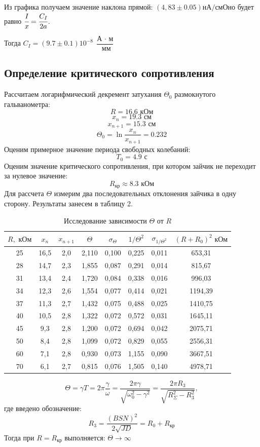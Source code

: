 \documentclass[a4paper, 12pt]{article}
\begin{document}
Из графика получаем значение наклона прямой: $(4,83\pm 0.05)\text{нА/см}$Оно будет равно $\cfrac{I}{x}=\cfrac{C_I}{2a}$. 

Тогда $\boxed{C_I = (9.7 \pm  0.1)10^{-8}\; \dfrac{\text{А $\cdot$ м}}{\text{ мм}}}$
	
\subsection*{Определение критического сопротивления}
Рассчитаем логарифмический декремент затухания $\Theta_0$ размокнутого гальванометра:
$$R = 16.6 \text{ кОм}$$
$$x_n = 19.3 \text{ см}$$
$$x_{n+1} = 15.3 \text{ см}$$
$$\Theta_0 = \ln \dfrac{x_n}{x_{n+1}} = 0.232$$	
Оценим примерное значение периода свободных колебаний:
$$T_0 = 4.9 \text{ с}$$
Оценим значение критического сопротивления, при котором зайчик не переходит за нулевое значение:
$$\boxed{R_{\text{кр}} \approx 8.3 \text{ кОм}}$$
Для рассчета $\Theta$ измерим два последовательных отклонения зайчика в одну сторону. Результаты занесем в таблицу 2.
\begin{table}[H]
\centering
\begin{tabular}{|c|c|c|c|c|c|c|c|}
\hline
$R, \text{ кОм}$ & $x_n$ & $x_{n+1}$ & $\Theta$ &$\sigma_{\Theta}$& $1/\Theta^2$ & $\sigma_{1/\Theta^2}$ & $(R+R_0)^2 \text{ кОм}$ \\ \hline
25&	16,5&	2,0&	2,110&	0,100&	0,225&	0,011&	653,31 \\ \hline
28&	14,7&	2,3&	1,855&	0,087&	0,291&	0,014&	815,67 \\ \hline
31&	13,4&	2,4&	1,720&	0,084&	0,338&	0,016&	996,03 \\ \hline
34&	12,3&	2,6&	1,554&	0,077&	0,414&	0,021&	1194,39 \\ \hline
37&	11,3&	2,7&	1,432&	0,075&	0,488&	0,025&	1410,75 \\ \hline
40&	10,5&	2,8&	1,322&	0,072&	0,572&	0,031&	1645,11 \\ \hline
45&	9,3&	2,8&	1,200&	0,072&	0,694&	0,042&	2075,71 \\ \hline
50&	8,4&	2,8&	1,099&	0,072&	0,829&	0,055&	2556,31 \\ \hline
60&	7,1&	2,8&	0,930&	0,073&	1,155&	0,090&	3667,51 \\ \hline
70&	6,1&	2,7&	0,815&	0,076&	1,505&	0,140&	4978,71 \\ \hline
\end{tabular}
\caption{Исследование зависимости $\Theta$ от $R$}
\end{table}

\begin{equation}
\Theta = \gamma T = 2 \pi \dfrac{\gamma}{\omega} = \dfrac{2 \pi \gamma}{\sqrt{\omega_0^2 - \gamma^2}} = \dfrac{2 \pi R_3}{\sqrt{R_\Sigma^2 - R_3^2}},
\label{eq:critical}
\end{equation}
где введено обозначение:
$$R_3 = \frac{(BSN)^2}{2\sqrt{JD}} = R_0 + R_\text{кр}$$
Тогда при $R = R_\text{кр}$  выполняется: $\Theta \rightarrow \infty$
\end{document}
